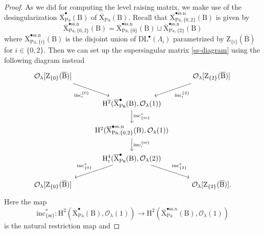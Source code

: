 \documentclass[10pt]{amsart}
\numberwithin{equation}{section}
\theoremstyle{definition}
\def\Pa{\mathrm{Pa}}
\def\calO{\mathcal{O}}
\def\rmc{\mathrm{c}}
\def\rmB{\mathrm{B}}
\def\rmH{\mathrm{H}}
\def\rmX{\mathrm{X}}
\def\rmZ{\mathrm{Z}}
\begin{document}
\begin{proof} As we did for computing the level raising matrix, we make use of the desingularization $\overline{\rmX}^{\bullet}_{\Pa}(\rmB)$ of $\overline{\rmX}_{\Pa}(\rmB)$. Recall that $\overline{\rmX}^{\bullet\mathrm{ss.n}}_{\Pa, \{0, 2\}}(\rmB)$ is given by
\begin{equation*}
\overline{\rmX}^{\bullet\mathrm{ss.n}}_{\Pa, \{0, 2\}}(\rmB)=\overline{\rmX}^{\bullet\mathrm{ss.n}}_{\Pa, \{0\}}(\rmB)\sqcup \overline{\rmX}^{\bullet\mathrm{ss.n}}_{\Pa, \{2\}}(\rmB) 
\end{equation*}
where $\overline{\rmX}^{\bullet\mathrm{ss.n}}_{\Pa, \{i\}}(\rmB)$ is the disjoint union of $\mathrm{DL}^{\bullet}(\Lambda_{i})$ parametrized by $\rmZ_{\{i\}}(\overline{\rmB})$ for $i\in\{0,2\}$. Then we can set up the supersingular matrix \eqref{ss-diagram} using the following diagram instead
\begin{equation}\label{ss-diagram-sm}
\begin{tikzcd}
\calO_{\lambda}[\rmZ_{\{0\}}(\overline{\rmB})] \arrow[rd, "\mathrm{inc}^{\{0\}}_{!}"'] &                                    &  \calO_{\lambda}[\rmZ_{\{2\}}(\overline{\rmB})]\arrow[ld, "\mathrm{inc}^{\{2\}}_{!}"] \\
                   & \rmH^{2}(\overline{\rmX}^{\bullet}_{\Pa}(\rmB), \calO_{\lambda}(1)) \arrow[d, "\mathrm{inc}^{\ast}_{\{\mathrm{ss}\}}"]                   &                   \\
                   & \rmH^{2}(\overline{\rmX}^{\bullet\mathrm{ss.n}}_{\Pa, \{0,2\}}(\rmB), \calO_{\lambda}(1)) \arrow[d, "\mathrm{inc}^{\{\mathrm{ss}\}}_{!}"]                   &                   \\
                   &  \rmH^{4}_{\rmc}(\overline{\rmX}^{\bullet}_{\Pa}(\rmB), \calO_{\lambda}(2)) \arrow[ld, "\mathrm{inc}^{\ast}_{\{0\}}"'] \arrow[rd, "\mathrm{inc}^{\ast}_{\{2\}}"] &                   \\
 \calO_{\lambda}[\rmZ_{\{0\}}(\overline{\rmB})]            &                                    &   \calO_{\lambda}[\rmZ_{\{2\}}(\overline{\rmB})].            
\end{tikzcd}
\end{equation}
Here the map
\begin{equation*}
\mathrm{inc}^{\ast}_{\{\mathrm{ss}\}}: \rmH^{2}(\overline{\rmX}^{\bullet}_{\Pa}(\rmB), \calO_{\lambda}(1))\rightarrow \rmH^{2}(\overline{\rmX}^{\bullet\mathrm{ss}.n}_{\Pa}(\rmB), \calO_{\lambda}(1)) 
\end{equation*}
is the natural restriction map and 

\end{proof}
\end{document}
